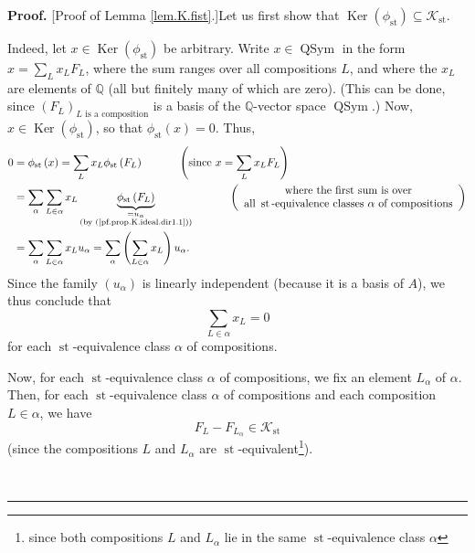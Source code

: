 \documentclass[numbers=enddot,12pt,final,onecolumn,notitlepage]{scrartcl}%
\theoremstyle{definition}
\newenvironment{proof}[1][Proof]{\noindent\textbf{#1.} }{\ \rule{0.5em}{0.5em}}
\newenvironment{verlong}{}{}
\let\sumnonlimits\sum
\renewcommand{\sum}{\sumnonlimits\limits}
\begin{document}
\begin{verlong}
\begin{proof}
[Proof of Lemma \ref{lem.K.fist}.]Let us first show that $\operatorname*{Ker}%
\left(  \phi_{\operatorname{st}}\right)  \subseteq\mathcal{K}%
_{\operatorname{st}}$.

Indeed, let $x\in\operatorname*{Ker}\left(  \phi_{\operatorname{st}}\right)
$ be arbitrary. Write $x\in\operatorname*{QSym}$ in the form $x=\sum_{L}%
x_{L}F_{L}$, where the sum ranges over all compositions $L$, and where the
$x_{L}$ are elements of $\mathbb{Q}$ (all but finitely many of which are
zero). (This can be done, since $\left(  F_{L}\right)  _{L\text{ is a
composition}}$ is a basis of the $\mathbb{Q}$-vector space
$\operatorname*{QSym}$.) Now,
$x\in\operatorname*{Ker}\left(  \phi_{\operatorname{st}}\right)  $,
so that $\phi_{\operatorname{st}}\left( x\right)  =0$. Thus,%
\begin{align*}
0  &  =\phi_{\operatorname{st}}\left(  x\right)  =\sum_{L}x_{L}%
\phi_{\operatorname{st}}\left(  F_{L}\right)  \ \ \ \ \ \ \ \ \ \ \left(
\text{since }x=\sum_{L}x_{L}F_{L}\right) \\
&  =\sum_{\alpha}\sum_{L\in\alpha}x_{L}\underbrace{\phi_{\operatorname{st}}
\left(  F_{L}\right)  }_{\substack{=u_{\alpha}\\\text{(by
(\ref{pf.prop.K.ideal.dir1.1}))}}}\ \ \ \ \ \ \ \ \ \ \left(
\begin{array}
[c]{c}%
\text{where the first sum is over}\\
\text{all }\operatorname{st}\text{-equivalence classes }\alpha\text{ of
compositions}%
\end{array}
\right) \\
&  =\sum_{\alpha}\sum_{L\in\alpha}x_{L}u_{\alpha}=\sum_{\alpha}\left(
\sum_{L\in\alpha}x_{L}\right)  u_{\alpha}.
\end{align*}
Since the family $\left(  u_{\alpha}\right)  $ is linearly independent
(because it is a basis of $A$), we thus conclude that
\begin{equation}
\sum_{L\in\alpha}x_{L}=0 \label{pf.prop.K.ideal.dir1.2}%
\end{equation}
for each $\operatorname{st}$-equivalence class $\alpha$ of compositions.

Now, for each $\operatorname{st}$-equivalence class $\alpha$ of compositions,
we fix an element $L_{\alpha}$ of $\alpha$. Then, for each
$\operatorname{st}$-equivalence class $\alpha$ of compositions and each
composition $L\in\alpha $, we have
\begin{equation}
F_{L}-F_{L_{\alpha}}\in\mathcal{K}_{\operatorname{st}}
\label{pf.prop.K.ideal.dir1.3}%
\end{equation}
(since the compositions $L$ and $L_{\alpha}$ are $\operatorname{st}%
$-equivalent\footnote{since both compositions $L$ and $L_{\alpha}$ lie in the
same $\operatorname{st}$-equivalence class $\alpha$}).


\end{proof}
\end{verlong}
\end{document}
